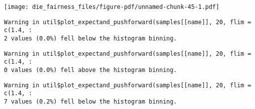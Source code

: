 \documentclass[
  letterpaper,
  DIV=11,
  numbers=noendperiod]{scrartcl}
\newenvironment{Shaded}{\begin{snugshade}}{\end{snugshade}}
\newcommand{\AttributeTok}[1]{\textcolor[rgb]{0.40,0.45,0.13}{#1}}
\newcommand{\ControlFlowTok}[1]{\textcolor[rgb]{0.00,0.23,0.31}{#1}}
\newcommand{\DecValTok}[1]{\textcolor[rgb]{0.68,0.00,0.00}{#1}}
\newcommand{\FloatTok}[1]{\textcolor[rgb]{0.68,0.00,0.00}{#1}}
\newcommand{\FunctionTok}[1]{\textcolor[rgb]{0.28,0.35,0.67}{#1}}
\newcommand{\NormalTok}[1]{\textcolor[rgb]{0.00,0.23,0.31}{#1}}
\newcommand{\OtherTok}[1]{\textcolor[rgb]{0.00,0.23,0.31}{#1}}
\newcommand{\SpecialCharTok}[1]{\textcolor[rgb]{0.37,0.37,0.37}{#1}}
\newcommand{\StringTok}[1]{\textcolor[rgb]{0.13,0.47,0.30}{#1}}
\begin{document}
\begin{Shaded}
\end{Shaded}

\texttt{[image: die\_fairness\_files/figure-pdf/unnamed-chunk-45-1.pdf]}

\begin{verbatim}
Warning in util$plot_expectand_pushforward(samples[[name]], 20, flim = c(1.4, :
2 values (0.0%) fell below the histogram binning.
\end{verbatim}

\begin{verbatim}
Warning in util$plot_expectand_pushforward(samples[[name]], 20, flim = c(1.4, :
0 values (0.0%) fell above the histogram binning.
\end{verbatim}

\begin{verbatim}
Warning in util$plot_expectand_pushforward(samples[[name]], 20, flim = c(1.4, :
7 values (0.2%) fell below the histogram binning.
\end{verbatim}
\end{document}
